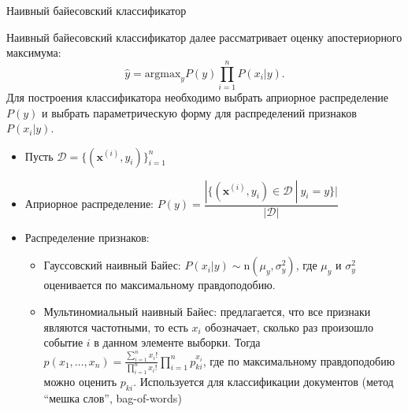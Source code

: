 \documentclass{beamer}
\begin{document}
\begin{frame}{Наивный байесовский классификатор}
    \footnotesize

    Наивный байесовский классификатор далее рассматривает оценку апостериорного максимума:
    \begin{equation}
        \hat{y} = \text{argmax}_{y} P(y) \prod_{i = 1}^n P(x_i | y).
    \end{equation}
    Для построения классификатора необходимо выбрать априорное распределение $P(y)$ и выбрать параметрическую форму для распределений признаков $P(x_i | y)$.
    
    \begin{itemize}
        \item Пусть $\mathcal{D} = \{(\bm{x}^{(i)}, y_i)\}_{i=1}^n$ 
        \item Априорное распределение: $P(y) = \dfrac{|\{(\bm{x}^{(i)}, y_i) \in \mathcal{D} \ | \ y_i = y\}|}{|\mathcal{D}|}$
        \item Распределение признаков:
        \begin{itemize}
            \footnotesize
            \item Гауссовский наивный Байес: $P(x_i | y) \sim \text{n}(\mu_y, \sigma_y^2)$, где $\mu_y$ и $\sigma_y^2$ оценивается по максимальному правдоподобию.
            \item Мультиномиальный наивный Байес: предлагается, что все признаки являются частотными, то есть $x_i$ обозначает, сколько раз произошло событие $i$ в данном элементе выборки. Тогда $p(x_1, \dots, x_n) = \frac{\sum_{i=1}^n x_i !}{\prod_{i=1}^n x_i !} \prod_{i=1}^n p_{ki}^{x_i}$, где по максимальному правдоподобию можно оценить $p_{ki}$. Используется для классификации документов (метод ``мешка слов'', bag-of-words)
        \end{itemize}
    \end{itemize}
\end{frame}
\end{document}
